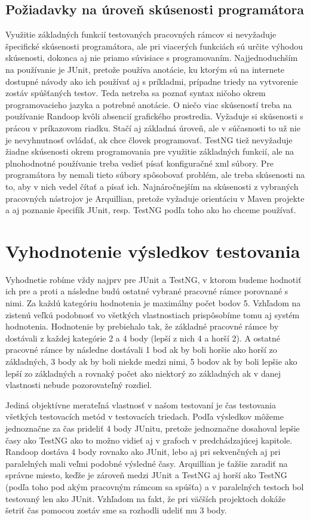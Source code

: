 \documentclass[11pt,twoside,slovak,a4paper]{article}
\begin{document}
	\subsection{Požiadavky na úroveň skúsenosti programátora}
	Využitie základných funkcií testovaných pracovných rámcov si nevyžaduje špecifické skúsenosti programátora, ale pri viacerých funkciách sú určite výhodou skúsenosti, dokonca aj nie priamo súvisiace s programovaním. Najjednoduchším na používanie je JUnit, pretože používa anotácie, ku ktorým sú na internete dostupné návody ako ich používať aj s príkladmi, prípadne triedy na vytvorenie zostáv spúšťaných testov. Teda netreba sa poznať syntax ničoho okrem programovacieho jazyka a potrebné anotácie. O niečo viac skúseností treba na používanie Randoop kvôli absencií grafického prostredia. Vyžaduje si skúsenosti s prácou v príkazovom riadku. Stačí aj základná úroveň, ale v súčasnosti to už nie je nevyhnutnosť ovládať, ak chce človek programovať. TestNG tiež nevyžaduje žiadne skúsenosti okrem programovania pre využitie základných funkcií, ale na plnohodnotné používanie treba vedieť písať konfiguračné xml súbory. Pre programátora by nemali tieto súbory spôsobovať problém, ale treba skúsenosti na to, aby v nich vedel čítať a písať ich. Najnáročnejším na skúsenosti z vybraných pracovných nástrojov je Arquillian, pretože vyžaduje orientáciu v Maven projekte a aj poznanie špecifík JUnit, resp. TestNG podľa toho ako ho chceme používať.
	

	\newpage
 	\thispagestyle{plain}
	\section{Vyhodnotenie výsledkov testovania}
	Vyhodnetie robíme vždy najprv pre JUnit a TestNG, v ktorom budeme hodnotiť ich pre a proti a následne budú ostatné vybrané pracovné rámce porovnané s nimi. Za každú kategóriu hodnotenia je maximálny počet bodov 5. Vzhľadom na zistenú veľkú podobnosť vo všetkých vlastnostiach prispôsobíme tomu aj systém hodnotenia. Hodnotenie by prebiehalo tak, že základné pracovné rámce by dostávali z každej kategórie 2 a 4 body (lepší z nich 4 a horší 2). A ostatné pracovné rámce by následne dostávali 1 bod ak by boli horšie ako horší zo základných, 3 body ak by boli niekde medzi nimi, 5 bodov ak by boli lepšie ako lepší zo základných a rovnaký počet ako niektorý zo základných ak v danej vlastnosti nebude pozorovateľný rozdiel.
	
	Jediná objektívne merateľná vlastnosť v našom testovaní je čas testovania všetkých testovacích metód v testovacích triedach. Podľa výsledkov môžeme jednoznačne za čas prideliť 4 body JUnitu, pretože jednoznačne dosahoval lepšie časy ako TestNG ako to možno vidieť aj v grafoch v predchádzajúcej kapitole. Randoop dostáva 4 body rovnako ako JUnit, lebo aj pri sekvenčných aj pri paralelných mali veľmi podobné výsledné časy. Arquillian je ťažšie zaradiť na správne miesto, keďže je zároveň medzi JUnit a TestNG aj horší ako TestNG (podľa toho pod akým pracovným rámcom sa spúšťa) a v paralelných testoch bol testovaný len ako JUnit. Vzhľadom na fakt, že pri väčších projektoch dokáže šetriť čas pomocou zostáv sme sa rozhodli udeliť mu 3 body.
	
\end{document}
